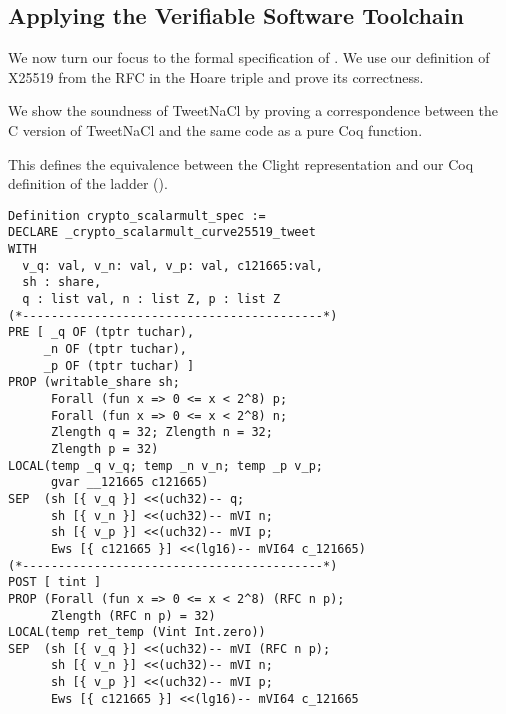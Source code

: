 \subsection{Applying the Verifiable Software Toolchain}
\label{subsec:with-VST}

\begin{sloppypar}
      We now turn our focus to the formal specification of .
      We use our definition of X25519 from the RFC in the Hoare triple and prove
      its correctness.
\end{sloppypar}

We show the soundness of TweetNaCl by proving a correspondence between
the C version of TweetNaCl and the same code as a pure Coq function.

This defines the equivalence between the Clight representation and our Coq
definition of the ladder ().

\begin{lstlisting}[language=CoqVST]
Definition crypto_scalarmult_spec :=
DECLARE _crypto_scalarmult_curve25519_tweet
WITH
  v_q: val, v_n: val, v_p: val, c121665:val,
  sh : share,
  q : list val, n : list Z, p : list Z
(*------------------------------------------*)
PRE [ _q OF (tptr tuchar),
     _n OF (tptr tuchar),
     _p OF (tptr tuchar) ]
PROP (writable_share sh;
      Forall (fun x => 0 <= x < 2^8) p;
      Forall (fun x => 0 <= x < 2^8) n;
      Zlength q = 32; Zlength n = 32;
      Zlength p = 32)
LOCAL(temp _q v_q; temp _n v_n; temp _p v_p;
      gvar __121665 c121665)
SEP  (sh [{ v_q }] <<(uch32)-- q;
      sh [{ v_n }] <<(uch32)-- mVI n;
      sh [{ v_p }] <<(uch32)-- mVI p;
      Ews [{ c121665 }] <<(lg16)-- mVI64 c_121665)
(*------------------------------------------*)
POST [ tint ]
PROP (Forall (fun x => 0 <= x < 2^8) (RFC n p);
      Zlength (RFC n p) = 32)
LOCAL(temp ret_temp (Vint Int.zero))
SEP  (sh [{ v_q }] <<(uch32)-- mVI (RFC n p);
      sh [{ v_n }] <<(uch32)-- mVI n;
      sh [{ v_p }] <<(uch32)-- mVI p;
      Ews [{ c121665 }] <<(lg16)-- mVI64 c_121665
\end{lstlisting}

